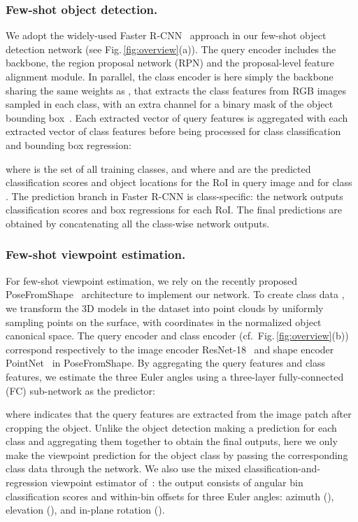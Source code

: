 \documentclass[runningheads]{llncs}
\begin{document}
\subsubsection{Few-shot object detection.}
We adopt the widely-used Faster R-CNN~\cite{renNIPS15fasterrcnn} approach in our few-shot object detection network (see Fig.\,\ref{fig:overview}(a)).
The query encoder  includes the backbone, the region proposal network (RPN) and the proposal-level feature alignment module. 
In parallel, the class encoder  is here simply the backbone sharing the same weights as , that extracts the class features from RGB images sampled in each class, with an extra channel for a binary mask of the object bounding box~\cite{YOLO-FS2019,metarcnn2019}.
Each extracted vector of query features is aggregated with each extracted vector of class features before being processed for class classification and bounding box regression:

where  is the set of all training classes, and where  and  are the predicted classification scores and object locations for the  RoI in query image  and for class .
The prediction branch in Faster R-CNN is class-specific: the network outputs  classification scores and  box regressions for each RoI. The final predictions are obtained by concatenating all the class-wise network outputs.



\subsubsection{Few-shot viewpoint estimation.}
For few-shot viewpoint estimation, we rely on the recently proposed PoseFromShape~\cite{Xiao2019PoseFromShape} architecture to implement our network.
To create class data , we transform the 3D models in the dataset into point clouds by uniformly sampling points on the surface, with coordinates in the normalized object canonical space. The query encoder  and class encoder  (cf.\ Fig.\,\ref{fig:overview}(b)) correspond respectively to the image encoder ResNet-18~\cite{He2015ResNet} and shape encoder PointNet~\cite{Qi2016PointNetDL} in PoseFromShape.
By aggregating the query features and class features, we estimate the three Euler angles using a three-layer fully-connected (FC) sub-network as the predictor:

where  indicates that the query features are extracted from the image patch after cropping the object.
Unlike the object detection making a prediction for each class and aggregating them together to obtain the final outputs, here we only make the viewpoint prediction for the object class  by passing the corresponding class data through the network.
We also use the mixed classification-and-regression viewpoint estimator of~\cite{Xiao2019PoseFromShape}: the output consists of angular bin classification scores and within-bin offsets for three Euler angles: azimuth (), elevation (), and in-plane rotation ().
\end{document}
